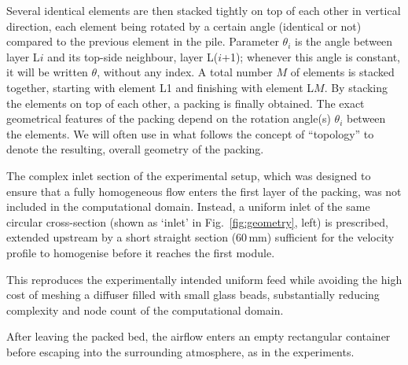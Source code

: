 Several identical elements are then stacked tightly on top of each other in vertical direction, each element being rotated by a certain angle (identical or not) compared to the previous element in the pile. Parameter $\theta_{i}$ is the angle between layer L$i$ and its top-side neighbour, layer L($i$+1); whenever this angle is constant, it will be written $\theta$, without any index. A total number $M$ of elements is stacked together, starting with element L1 and finishing with element L$M$. By stacking the elements on top of each other, a packing is finally obtained. The exact geometrical features of the packing depend on the rotation angle(s) $\theta_{i}$ between the elements. We will often use in what follows the concept of ``topology'' to denote the resulting, overall geometry of the packing.

The complex inlet section of the experimental setup, which was designed to ensure that a fully homogeneous flow enters the first layer of the packing, was not included in the computational domain. Instead, a uniform inlet of the same circular cross-section (shown as `inlet' in Fig.~\ref{fig:geometry}, left) is prescribed, extended upstream by a short straight section ($60\,\mathrm{mm}$) sufficient for the velocity profile to homogenise before it reaches the first module.

This reproduces the experimentally intended uniform feed while avoiding the high cost of meshing a diffuser filled with small glass beads, substantially reducing complexity and node count of the computational domain.

After leaving the packed bed, the airflow enters an empty rectangular container before escaping into the surrounding atmosphere, as in the experiments.


